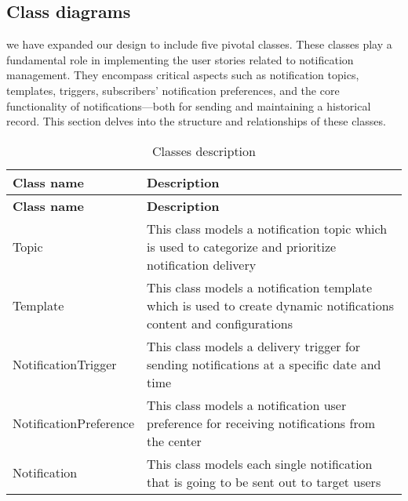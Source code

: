 \subsection{Class diagrams}
we have expanded our design to include five pivotal classes. These classes play a fundamental role in
implementing the user stories related to notification management. They encompass critical aspects such
as notification topics, templates, triggers, subscribers' notification preferences, and the core functionality of
notifications—both for sending and maintaining a historical record. This section delves into the structure
and relationships of these classes. \\

\begin{longtable}{ | m{} | m{} | }
    \caption{Classes description}                                                                                                               \\
    \hline
    \textbf{Class name}    & \textbf{Description}                                                                                               \\
    \hline
    \endfirsthead
    \hline
    \textbf{Class name}    & \textbf{Description}                                                                                               \\
    \hline
    \endhead
    \endfoot
    \hline
    \endlastfoot
    Topic                  & This class models a notification topic which is used to categorize and prioritize notification delivery            \\
    \hline
    Template               & This class models a notification template which is used to create dynamic notifications content and configurations \\
    \hline
    NotificationTrigger    & This class models a delivery trigger for sending notifications at a specific date and time                         \\
    \hline
    NotificationPreference & This class models a notification user preference for receiving notifications from the center                       \\
    \hline
    Notification           & This class models each single notification that is going to be sent out to target users                            \\
    \hline
\end{longtable}

